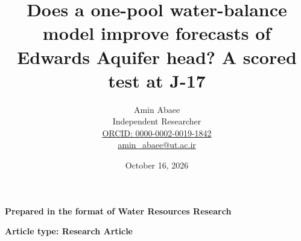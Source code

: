 \documentclass[11pt]{article}
\begin{document}
\title{Does a one-pool water-balance model improve forecasts of Edwards Aquifer head? A scored test at J-17}
\author{Amin Abaee\\[0.35em]
{\small Independent Researcher}\\[0.55em]
{\small\href{https://orcid.org/0000-0002-0019-1842}{ORCID: 0000-0002-0019-1842}}\\[0.3em]
{\small\href{mailto:amin\_abaee@ut.ac.ir}{amin\_abaee@ut.ac.ir}}}
\date{October 16, 2026}
\maketitle

{\centering\small \textbf{Prepared in the format of Water Resources Research}\par}
{\centering\small \textbf{Article type: Research Article}\par}
\end{document}
